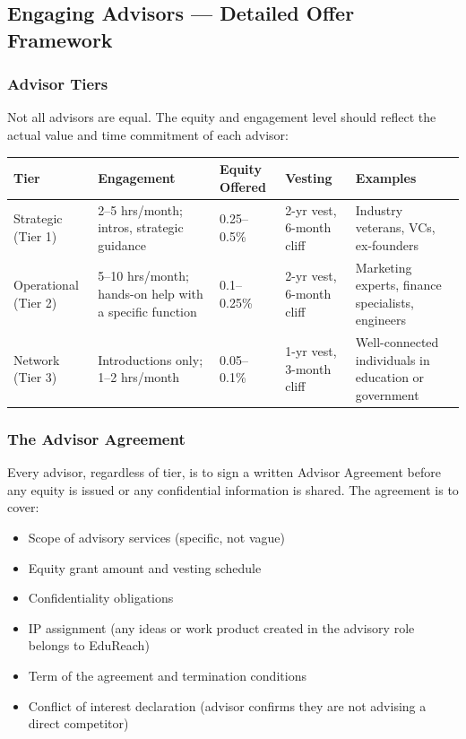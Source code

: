 \documentclass[12pt,a4paper]{article}
\begin{document}
\subsection{Engaging Advisors --- Detailed Offer Framework}

\subsubsection{Advisor Tiers}

Not all advisors are equal. The equity and engagement level should reflect the actual value and time commitment of each advisor:

\begin{tabularx}{\linewidth}{L{2.5cm} L{3cm} L{3cm} L{3cm} X}
  \toprule
  \textbf{Tier} & \textbf{Engagement} & \textbf{Equity Offered} & \textbf{Vesting} & \textbf{Examples} \\
  \midrule
  Strategic (Tier 1) & 2--5 hrs/month; intros, strategic guidance & 0.25--0.5\% & 2-yr vest, 6-month cliff & Industry veterans, VCs, ex-founders \\[0.5em]
  Operational (Tier 2) & 5--10 hrs/month; hands-on help with a specific function & 0.1--0.25\% & 2-yr vest, 6-month cliff & Marketing experts, finance specialists, engineers \\[0.5em]
  Network (Tier 3) & Introductions only; 1--2 hrs/month & 0.05--0.1\% & 1-yr vest, 3-month cliff & Well-connected individuals in education or government \\
  \bottomrule
\end{tabularx}

\subsubsection{The Advisor Agreement}

Every advisor, regardless of tier, is to sign a written Advisor Agreement before any equity is issued or any confidential information is shared. The agreement is to cover:

\begin{itemize}
  \item Scope of advisory services (specific, not vague)
  \item Equity grant amount and vesting schedule
  \item Confidentiality obligations
  \item IP assignment (any ideas or work product created in the advisory role belongs to EduReach)
  \item Term of the agreement and termination conditions
  \item Conflict of interest declaration (advisor confirms they are not advising a direct competitor)
\end{itemize}
\end{document}
